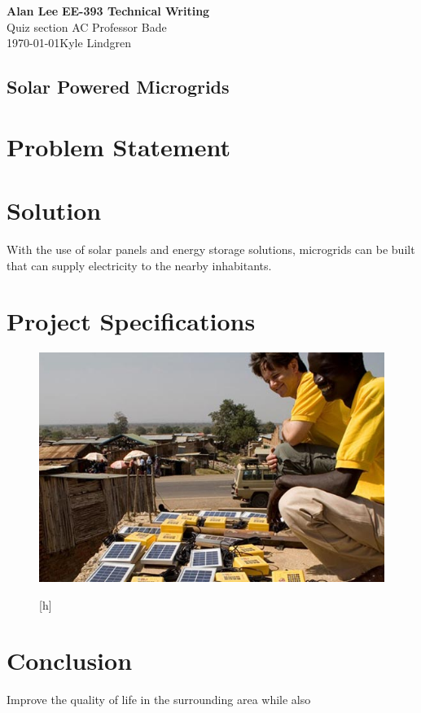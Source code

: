 \documentclass[11pt]{article}
\begin{document}
% 
\noindent
\Large \textbf{Alan Lee} \hfill 
\Large \textbf {EE-393 Technical Writing} \\
Quiz section AC \hfill Professor Bade \\
\today \hfill Kyle Lindgren

\begin{center}
\section*{Solar Powered Microgrids}
\end{center}

\section*{Problem Statement}


\section*{Solution}
With the use of solar panels and energy storage solutions, microgrids can be built that can supply electricity to the nearby inhabitants.

\section*{Project Specifications}

\begin{figure}[h]
\centering
\includegraphics[scale = 0.20]{Solar_Panel.jpg}
\caption{}[h]
\end{figure}
\section*{Conclusion}
Improve the quality of life in the surrounding area while also 
\end{document}
